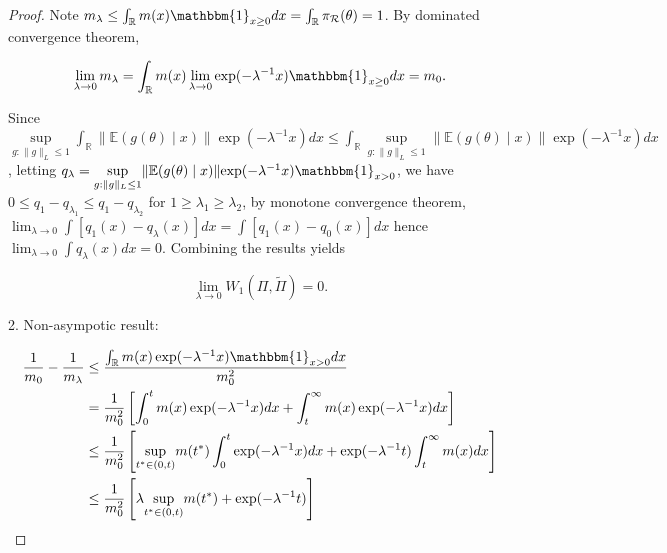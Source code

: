 \documentclass[10pt]{article}
\newcommand{\mc}[1]{\mathcal{#1}}
\DeclareMathOperator{\1}{\mathbbm{1}}
\begin{document}
\begin{proof}[Proof]
Note $m_\lambda\le \int_\mathbb{R} m(x) \mathbbm{1}_{x \ge 0}  dx =\int_\mathbb{R} \pi_{\mc R}(\theta) =1$. By dominated convergence theorem, 

\begin{equation}
\lim_{\lambda\rightarrow 0}m_\lambda= \int_\mathbb{R}  m(x) \lim_{\lambda\rightarrow 0}\exp(- \lambda^{-1} x ) \mathbbm{1}_{x \ge 0}  d x = m_0.
\end{equation}


Since 
$ \underset{g:\|g\|_L\le 1}\sup \int_\mathbb{R}  \|\mathbb{E}(g(\theta) \mid x)\| { \exp(- \lambda^{-1} x)} dx \le \int_\mathbb{R} \underset{g:\|g\|_L\le 1}\sup \|\mathbb{E}(g(\theta) \mid x)\| { \exp(- \lambda^{-1} x)} dx$,
letting $q_\lambda=	  \underset{g:\|g\|_L\le 1}\sup \|\mathbb{E}(g(\theta) \mid x)\| { \exp(- \lambda^{-1} x)}
\mathbbm{1}_{x > 0}  $, we have $0\le q_1-q_{\lambda_1}\le q_1-q_{\lambda_2}$ for $1\ge\lambda_1\ge \lambda_2$, by monotone convergence theorem, $\lim_{\lambda\rightarrow 0}\int [ q_1(x)-q_\lambda(x)]dx = \int [q_1(x)- q_0(x) ]dx$ hence $\lim_{\lambda\rightarrow 0}\int q_\lambda(x)dx =0$. Combining the results yields 



\begin{equation}
\underset{\lambda \rightarrow 0}\lim W_1(\Pi,\tilde\Pi)=0.	  \end{equation}

2. Non-asympotic result:


\begin{equation}
\label{wass1}
\begin{aligned}
\frac{1}{m_0}-\frac{1}{m_\lambda} & \le  \frac{   \int_\mathbb{R}  m(x) \exp(- \lambda^{-1} x ) \mathbbm{1}_{x > 0}  d x } {  m_0^2}  \\
&= \frac{1}{ m_0^2} \left[ \int_0^{t}  m(x) \exp(- \lambda^{-1} x ) dx + \int_t^{\infty}  m(x) \exp(- \lambda^{-1} x ) dx \right] \\
&\le \frac{1}{ m_0^2} \left[  \underset{t^*\in (0,t)}\sup m(t^{*})\int_0^{t} \exp(- \lambda^{-1} x ) dx + \exp(- \lambda^{-1} t )\int_t^{\infty}  m(x) dx  \right] \\
&\le \frac{1}{ m_0^2} \left[\lambda \underset{t^*\in (0,t)}\sup  m(t^{*})  + \exp(- \lambda^{-1} t ) \right] 
\end{aligned}
\end{equation}


\end{proof}
\end{document}
